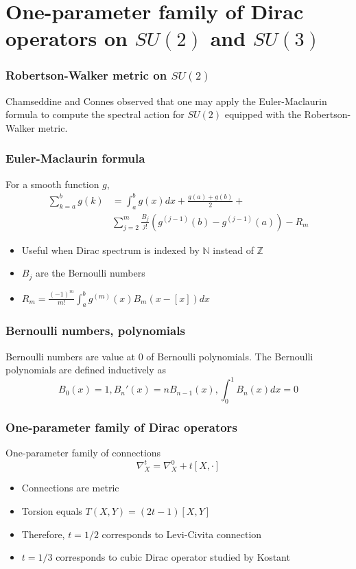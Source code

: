\documentclass{beamer}
\def\N{{\mathbb N}}
\def\Z{{\mathbb Z}}
\begin{document}
\section{One-parameter family of Dirac operators on $SU(2)$ and $SU(3)$}

\begin{frame}
  \frametitle{Robertson-Walker metric on $SU(2)$}
  \begin{block}{}
    Chamseddine and Connes observed that one may apply the Euler-Maclaurin formula to compute the spectral action for $SU(2)$ equipped with the Robertson-Walker metric.
  \end{block}
\end{frame}

\begin{frame}
  \frametitle{Euler-Maclaurin formula}
  \begin{block}{}
    For a smooth function $g$,
    \begin{align*}
      \sum_{k=a}^b g(k) &= \int_a^b g(x) dx + \frac{g(a) + g(b)}{2} +  \\
      & \sum_{j=2}^m \frac{B_j}{j!}(g^{(j-1)}(b) - g^{(j-1)}(a)) - R_m
    \end{align*}

    \begin{itemize}
      \item Useful when Dirac spectrum is indexed by $\N$ instead of $\Z$
      \item $B_j$ are the Bernoulli numbers
      \item $R_m = \frac{(-1)^m}{m!} \int_a^b g^{(m)}(x) B_m (x-[x])dx$
    \end{itemize}
  \end{block}
\end{frame}

\begin{frame}
  \frametitle{Bernoulli numbers, polynomials}
  Bernoulli numbers are value at 0 of Bernoulli polynomials. The Bernoulli polynomials are defined inductively as
  \[
    B_0(x) = 1, B_n'(x) = nB_{n-1}(x), \int_0^1 B_n(x)dx = 0
  \]
\end{frame}

\begin{frame}
  \frametitle{One-parameter family of Dirac operators}
  \begin{block}{One-parameter family of connections}
    \[
      \nabla_X^t = \nabla_X^0 + t[X, \cdot]
    \]
  \end{block}

  \pause

  \begin{block}{}
    \begin{itemize}
      \item Connections are metric
      \item Torsion equals $T(X,Y) = (2t-1)[X,Y]$
      \item Therefore, $t = 1/2$ corresponds to Levi-Civita connection
      \item $t = 1/3$ corresponds to cubic Dirac operator studied by Kostant
    \end{itemize}
  \end{block}
\end{frame}
\end{document}
